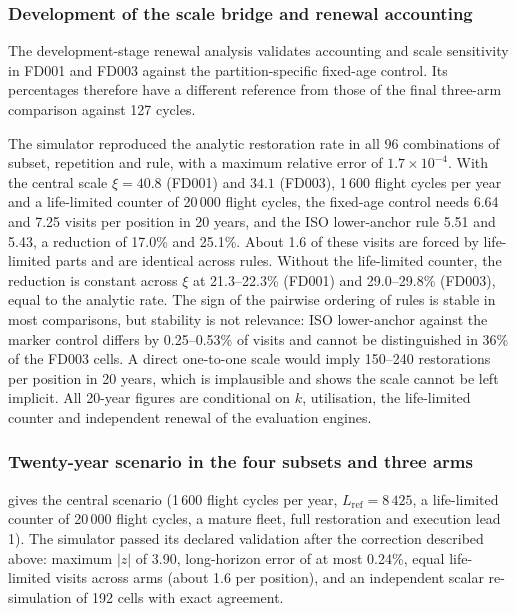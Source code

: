 \documentclass[preprint,12pt]{elsarticle}
\begin{document}
\subsubsection{Development of the scale bridge and renewal accounting}\label{sec:scale-results}

The development-stage renewal analysis validates accounting and scale sensitivity in FD001 and FD003 against the partition-specific fixed-age control. Its percentages therefore have a different reference from those of the final three-arm comparison against 127 cycles.

The simulator reproduced the analytic restoration rate in all 96 combinations of subset, repetition and rule, with a maximum relative error of $1.7\times10^{-4}$. With the central scale $\xi=40.8$ (FD001) and $34.1$ (FD003), 1\,600 flight cycles per year and a life-limited counter of 20\,000 flight cycles, the fixed-age control needs 6.64 and 7.25 visits per position in 20 years, and the ISO lower-anchor rule 5.51 and 5.43, a reduction of 17.0\% and 25.1\%. About 1.6 of these visits are forced by life-limited parts and are identical across rules. Without the life-limited counter, the reduction is constant across $\xi$ at 21.3--22.3\% (FD001) and 29.0--29.8\% (FD003), equal to the analytic rate. The sign of the pairwise ordering of rules is stable in most comparisons, but stability is not relevance: ISO lower-anchor against the marker control differs by 0.25--0.53\% of visits and cannot be distinguished in 36\% of the FD003 cells. A direct one-to-one scale would imply 150--240 restorations per position in 20 years, which is implausible and shows the scale cannot be left implicit. All 20-year figures are conditional on $k$, utilisation, the life-limited counter and independent renewal of the evaluation engines.

\subsubsection{Twenty-year scenario in the four subsets and three arms}\label{sec:twenty-results}


 gives the central scenario (1\,600 flight cycles per year, $L_{\mathrm{ref}}=8\,425$, a life-limited counter of 20\,000 flight cycles, a mature fleet, full restoration and execution lead 1). The simulator passed its declared validation after the correction described above: maximum $|z|$ of 3.90, long-horizon error of at most 0.24\%, equal life-limited visits across arms (about 1.6 per position), and an independent scalar re-simulation of 192 cells with exact agreement.
\end{document}
